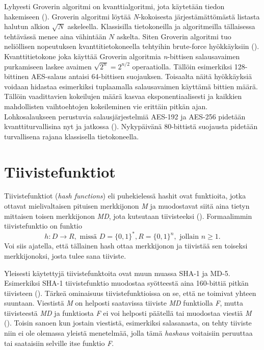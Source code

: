  Lyhyesti Groverin algoritmi on kvanttialgoritmi, jota käytetään tiedon hakemiseen (\cite{hayward2008quantum}). Groverin algoritmi löytää \emph{N}-kokoisesta järjestämättömästä listasta halutun alkion $\sqrt{N}$ askeleella. Klassisilla tietokoneilla ja algoritmeilla tällaisessa tehtävässä menee aina vähintään $N$ askelta. Siten Groverin algoritmi tuo neliöllisen nopeutuksen kvanttitietokoneella tehtyihin brute-force hyökkäyksiin (\cite{mavroeidis2018impact}). Kvanttitietokone joka käyttää Groverin algoritmia \emph{n}-bittisen salausavaimen purkamiseen laskee avaimen $\sqrt{2^{n}} = 2^{n/2}$ operaatiolla. Tällöin esimerkiksi 128-bittinen AES-salaus antaisi 64-bittisen suojauksen. Toisaalta näitä hyökkäyksiä voidaan hidastaa esimerkiksi tuplaamalla salausavaimen käyttämä bittien määrä. Tällöin vaadittavien kokeilujen määrä kasvaa eksponentiaalisesti ja kaikkien mahdollisten vaihtoehtojen kokeileminen vie erittäin pitkän ajan. Lohkosalaukseen perustuvia salausjärjestelmiä AES-192 ja AES-256 pidetään kvanttiturvallisina nyt ja jatkossa (\cite{mavroeidis2018impact}). Nykypäivänä 80-bittistä suojausta pidetään turvallisena rajana klassisella tietokoneella.
 
 \section{Tiivistefunktiot}
 Tiivistefunktiot (\emph{hash functions}) eli puhekielessä hashit  ovat funktioita, jotka ottavat mielivaltaisen pituisen merkkijonon \emph{M} ja muodostavat siitä aina tietyn mittaisen toisen merkkijonon \emph{MD}, jota kutsutaan tiivisteeksi (\cite{sobti2012cryptographic}). Formaalimmin tiivistefunktio on funktio
 \[h: D \to R, \text{ missä } D = \big\{0,1\big\}^{*}, R = \big\{0,1\big\}^{n}, \text{ jollain } n \geq 1.\] Voi siis ajatella, että tällainen hash ottaa merkkijonon ja tiivistää sen toiseksi merkkijonoksi, josta tulee sana tiiviste.
 
 Yleisesti käytettyjä tiivistefunktoita ovat muun muassa SHA-1 ja MD-5. %
 Esimerkiksi SHA-1 tiivistefunktio muodostaa syötteestä aina 160-bittiä pitkän tiivisteen (\cite{bellare2005introduction}). Tärkeä ominaisuus tiivistefunktioissa on se, että ne toimivat yhteen suuntaan. Viestistä \emph{M} on helposti saatavissa tiiviste \emph{MD} funktiolla \emph{F}, mutta tiivisteestä \emph{MD} ja funktiosta \emph{F} ei voi helposti päätellä tai muodostaa viestiä \emph{M} (\cite{bakhtiari1995cryptographic}). Toisin sanoen kun jostain viestistä, esimerkiksi salasanasta, on tehty tiiviste niin ei ole olemassa yleistä menetelmää, jolla tämä \emph{hashaus} voitaisiin peruuttaa tai saataisiin selville itse funktio \emph{F}.
 
